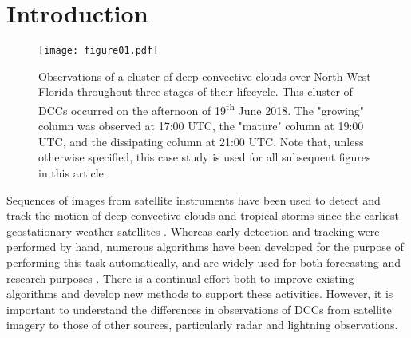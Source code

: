 
\section{Introduction} %

\begin{figure*}[t]
    \texttt{[image: figure01.pdf]}
    \caption{Observations of a cluster of deep convective clouds over North-West Florida throughout three stages of their lifecycle. This cluster of DCCs occurred on the afternoon of 19\textsuperscript{th} June 2018. The "growing" column was observed at 17:00 UTC, the "mature" column at 19:00 UTC, and the dissipating column at 21:00 UTC. Note that, unless otherwise specified, this case study is used for all subsequent figures in this article.}
    \label{fig:compare_sat_radar_glm}
\end{figure*}

Sequences of images from satellite instruments have been used to detect and track the motion of deep convective clouds and tropical storms since the earliest geostationary weather satellites \citep{menzel_cloud_2001}.
Whereas early detection and tracking were performed by hand, numerous algorithms have been developed for the purpose of performing this task automatically, and are widely used for both forecasting and research purposes \citep[e.g.][]{mecikalski_use_2011, senf_characterization_2015, senf_satellite-based_2017, feng_life_2012, feng_spatiotemporal_2019, zinner_cb-tram:_2008}.
There is a continual effort both to improve existing algorithms and develop new methods to support these activities.
However, it is important to understand the differences in observations of DCCs from satellite imagery to those of other sources, particularly radar and lightning observations.

